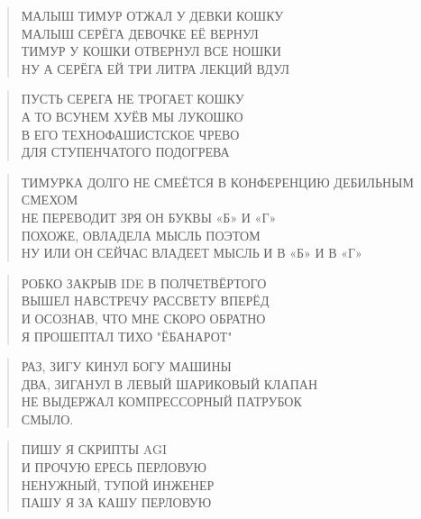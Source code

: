 \poemtitle{***}
\begin{verse}
МАЛЫШ ТИМУР ОТЖАЛ У ДЕВКИ КОШКУ\\
МАЛЫШ СЕРЁГА ДЕВОЧКЕ ЕЁ ВЕРНУЛ\\
ТИМУР У КОШКИ ОТВЕРНУЛ ВСЕ НОШКИ\\
НУ А СЕРЁГА ЕЙ ТРИ ЛИТРА ЛЕКЦИЙ ВДУЛ
\end{verse}

\poemtitle{***}
\begin{verse}
ПУСТЬ СЕРЕГА НЕ ТРОГАЕТ КОШКУ\\
А ТО ВСУНЕМ ХУЁВ МЫ ЛУКОШКО\\
В ЕГО ТЕХНОФАШИСТСКОЕ ЧРЕВО\\
ДЛЯ СТУПЕНЧАТОГО ПОДОГРЕВА
\end{verse}

\poemtitle{***}
\begin{verse}
ТИМУРКА ДОЛГО НЕ СМЕЁТСЯ В КОНФЕРЕНЦИЮ ДЕБИЛЬНЫМ СМЕХОМ\\
НЕ  ПЕРЕВОДИТ ЗРЯ ОН БУКВЫ «Б» И «Г»\\
ПОХОЖЕ, ОВЛАДЕЛА МЫСЛЬ ПОЭТОМ\\
НУ ИЛИ ОН СЕЙЧАС ВЛАДЕЕТ МЫСЛЬ И В «Б» И В «Г»
\end{verse}

\poemtitle{***}
\begin{verse}
РОБКО ЗАКРЫВ IDE В ПОЛЧЕТВЁРТОГО\\
ВЫШЕЛ НАВСТРЕЧУ РАССВЕТУ ВПЕРЁД\\
И ОСОЗНАВ, ЧТО МНЕ СКОРО ОБРАТНО\\
Я ПРОШЕПТАЛ ТИХО "ЁБАНАРОТ"
\end{verse}

\poemtitle{***}
\begin{verse}
РАЗ, ЗИГУ КИНУЛ БОГУ МАШИНЫ\\
ДВА, ЗИГАНУЛ В ЛЕВЫЙ ШАРИКОВЫЙ КЛАПАН\\
НЕ ВЫДЕРЖАЛ КОМПРЕССОРНЫЙ ПАТРУБОК\\
СМЫЛО.
\end{verse}

\poemtitle{***}
\begin{verse}
ПИШУ Я СКРИПТЫ AGI\\
И ПРОЧУЮ ЕРЕСЬ ПЕРЛОВУЮ\\
НЕНУЖНЫЙ, ТУПОЙ ИНЖЕНЕР\\
ПАШУ Я ЗА КАШУ ПЕРЛОВУЮ
\end{verse}


